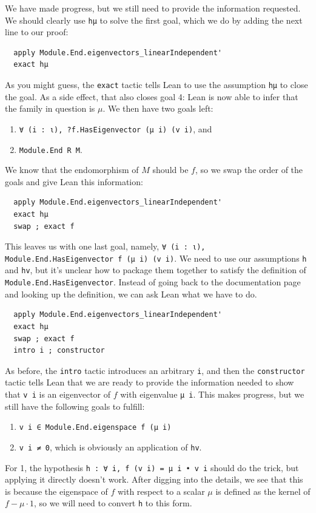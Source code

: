 \documentclass[11pt]{article}
\def\lean{\lstinline[language=lean]}
\begin{document}
We have made progress, but we still need to provide the information requested.
We should clearly use \lean"hμ" to solve the first goal, which we do by adding the next line to our proof:
\begin{lstlisting}
  apply Module.End.eigenvectors_linearIndependent'
  exact hμ
\end{lstlisting}
As you might guess, the \lean"exact" tactic tells Lean to use the assumption \lean"hμ" to close the goal.
As a side effect, that also closes goal 4: Lean is now able to infer that the family in question is $\mu$.
We then have two goals left:
\begin{enumerate}
  \item \lean"∀ (i : ι), ?f.HasEigenvector (μ i) (v i)", and
  \item \lean"Module.End R M".
\end{enumerate}
We know that the endomorphism of $M$ should be $f$, so we swap the order of the goals and give Lean
this information:
\begin{lstlisting}
  apply Module.End.eigenvectors_linearIndependent'
  exact hμ
  swap ; exact f
\end{lstlisting}
This leaves us with one last goal, namely, \lean"∀ (i : ι), Module.End.HasEigenvector f (μ i) (v i)".
We need to use our assumptions \texttt{h} and \texttt{hv}, but it's unclear how to package them together to satisfy the definition of \lean"Module.End.HasEigenvector".
Instead of going back to the documentation page and looking up the definition, we can ask Lean what we have to do.
\begin{lstlisting}
  apply Module.End.eigenvectors_linearIndependent'
  exact hμ
  swap ; exact f
  intro i ; constructor
\end{lstlisting}
As before, the \lean"intro" tactic introduces an arbitrary \lean"i",
and then the \lean"constructor" tactic tells Lean that we are ready to
provide the information needed to show that \lean"v i" is an eigenvector of $f$ with
eigenvalue \lean"μ i".
This makes progress, but we still have the following goals to fulfill:
\begin{enumerate}
  \item \lean"v i ∈ Module.End.eigenspace f (μ i)"
  \item \lean"v i ≠ 0", which is obviously an application of \texttt{hv}.
\end{enumerate}
For 1, the hypothesis \lean"h : ∀ i, f (v i) = μ i • v i" should do the trick, but applying it directly doesn't work.
After digging into the details, we see that this is because the eigenspace of $f$ with respect to a scalar $\mu$ is defined as the kernel of $f - \mu \cdot 1$, so we will need to convert \texttt{h} to this form.
\end{document}
